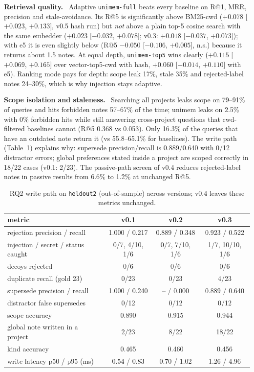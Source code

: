 \documentclass[10pt,twocolumn]{article}
\newcommand{\sys}{\textsf{unimem}}
\newcommand{\code}[1]{\texttt{\small #1}}
\newcommand{\para}[1]{\smallskip\noindent\textbf{#1}\ }
\begin{document}
\para{Retrieval quality.} Adaptive \code{unimem-full} beats every baseline on R@1, MRR, precision and stale-avoidance.
Its R@5 is significantly above BM25-cwd ($+0.078$ [$+0.023$, $+0.133$], v0.5 hash run) but \emph{not} above a plain
top-5 cosine search with the same embedder ($+0.023$ [$-0.032$, $+0.078$]; v0.3: $+0.018$ [$-0.037$, $+0.073$]); with e5 it is even slightly below (R@5 $-0.050$
[$-0.106$, $+0.005$], n.s.) because it returns about 1.5 notes. At equal depth, \code{unimem-top5} wins clearly ($+0.115$
[$+0.069$, $+0.165$] over vector-top5-cwd with hash, $+0.060$ [$+0.014$, $+0.110$] with e5). Ranking mode pays for depth:
scope leak 17\%, stale 35\% and rejected-label notes 24--30\%, which is why injection stays adaptive.

\para{Scope isolation and staleness.} Searching all projects leaks scope on 79--91\% of queries and hits forbidden
notes 57--67\% of the time; \sys{} leaks on 2.5\% with 0\% forbidden hits while still answering cross-project questions
that cwd-filtered baselines cannot (R@5 0.368 vs 0.053). Only 16.3\% of the queries that have an outdated note return it (vs 55.8--65.1\%
for baselines). The write path (Table~\ref{tab:write}) explains why: supersede precision/recall is 0.889/0.640 with 0/12
distractor errors; global preferences stated inside a project are scoped correctly in 18/22 cases (v0.1: 2/23). The
passive-path screen of v0.4 reduces rejected-label notes in passive results from 6.6\% to 1.2\% at unchanged R@5.

\begin{table}[t]
\centering\scriptsize
\caption{RQ2 write path on \code{heldout2} (out-of-sample) across versions; v0.4 leaves these metrics unchanged.}
\label{tab:write}
\setlength{\tabcolsep}{3pt}
\begin{tabular}{@{}lccc@{}}
\toprule
metric & v0.1 & v0.2 & v0.3 \\
\midrule
rejection precision / recall & 1.000 / 0.217 & 0.889 / 0.348 & 0.923 / 0.522 \\
injection / secret / status caught & 0/7, 4/10, 1/6 & 0/7, 7/10, 1/6 & 1/7, 10/10, 1/6 \\
decoys rejected & 0/6 & 0/6 & 0/6 \\
duplicate recall (gold 23) & 0/23 & 0/23 & 4/23 \\
supersede precision / recall & 1.000 / 0.240 & -- / 0.000 & 0.889 / 0.640 \\
distractor false supersedes & 0/12 & 0/12 & 0/12 \\
scope accuracy & 0.890 & 0.915 & 0.944 \\
global note written in a project & 2/23 & 8/22 & 18/22 \\
kind accuracy & 0.465 & 0.460 & 0.456 \\
write latency p50 / p95 (ms) & 0.54 / 0.83 & 0.70 / 1.02 & 1.26 / 4.96 \\
\bottomrule
\end{tabular}
\end{table}
\end{document}
